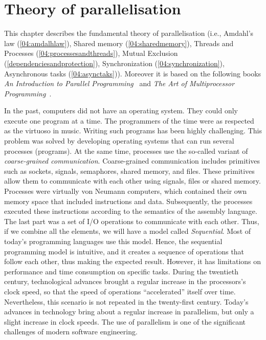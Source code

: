 \chapter{Theory of parallelisation}
\label{03:chapter:title}

This chapter describes the fundamental theory of parallelisation (i.e., Amdahl's law (\ref{04:amdalhlaw}), Shared memory (\ref{04:sharedmemory}), Threads and Processes (\ref{04:processesandthreads}), Mutual Exclusion (\ref{dependenciesandprotection}), Synchronization (\ref{04:synchronization}), Asynchronous tasks (\ref{04:asynctaks})).
Moreover it is based on the following books \emph{An Introduction to Parallel Programming}~\cite{introductionToParallelProgramming} and \emph{The Art of Multiprocessor Programming}~\cite{artOfMultiprocessorProgramming}.

In the past, computers did not have an operating system.
They could only execute one program at a time.
The programmers of the time were as respected as the virtuoso in music.
Writing such programs has been highly challenging.
This problem was solved by developing operating systems that can run several processes (programs).
At the same time, processes use the so-called variant of \emph{coarse-grained communication}.
Coarse-grained communication includes primitives such as sockets, signals, semaphores, shared memory, and files.
These primitives allow them to communicate with each other using signals, files or shared memory.
Processes were virtually von Neumann computers, which contained their own memory space that included instructions and data.
Subsequently, the processes executed these instructions according to the semantics of the assembly language.
The last part was a set of I/O operations to communicate with each other.
Thus, if we combine all the elements, we will have a model called \emph{Sequential}.
Most of today's programming languages use this model.
Hence, the sequential programming model is intuitive, and it creates a sequence of operations that follow each other, thus making the expected result.
However, it has limitations on performance and time consumption on specific tasks.
During the twentieth century, technological advances brought a regular increase in the processors's clock speed, so that the speed of operations ``accelerated'' itself over time.
Nevertheless, this scenario is not repeated in the twenty-first century.
Today's advances in technology bring about a regular increase in parallelism, but only a slight increase in clock speeds.
The use of parallelism is one of the significant challenges of modern software engineering.

